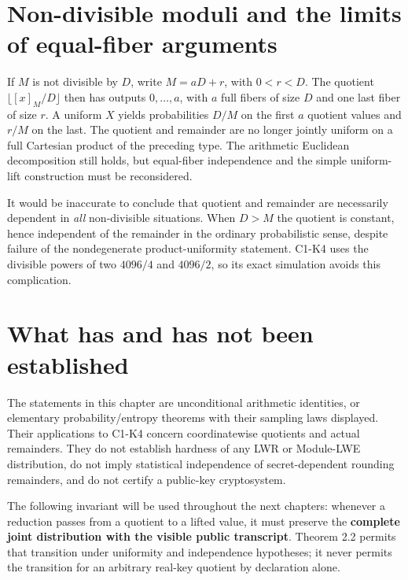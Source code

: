\documentclass[
  11pt,
  a4paper,
  oneside]{report}
\begin{document}
\section{Non-divisible moduli and the limits of equal-fiber
arguments}\label{non-divisible-moduli-and-the-limits-of-equal-fiber-arguments}

If \(M\) is not divisible by \(D\), write \(M=aD+r\), with \(0<r<D\).
The quotient \(\lfloor[x]_M/D\rfloor\) then has outputs \(0,\ldots,a\),
with \(a\) full fibers of size \(D\) and one last fiber of size \(r\). A
uniform \(X\) yields probabilities \(D/M\) on the first \(a\) quotient
values and \(r/M\) on the last. The quotient and remainder are no longer
jointly uniform on a full Cartesian product of the preceding type. The
arithmetic Euclidean decomposition still holds, but equal-fiber
independence and the simple uniform-lift construction must be
reconsidered.

It would be inaccurate to conclude that quotient and remainder are
necessarily dependent in \emph{all} non-divisible situations. When
\(D>M\) the quotient is constant, hence independent of the remainder in
the ordinary probabilistic sense, despite failure of the nondegenerate
product-uniformity statement. C1-K4 uses the divisible powers of two
\(4096/4\) and \(4096/2\), so its exact simulation avoids this
complication.

\section{What has and has not been
established}\label{what-has-and-has-not-been-established}

The statements in this chapter are unconditional arithmetic identities,
or elementary probability/entropy theorems with their sampling laws
displayed. Their applications to C1-K4 concern coordinatewise quotients
and actual remainders. They do not establish hardness of any LWR or
Module-LWE distribution, do not imply statistical independence of
secret-dependent rounding remainders, and do not certify a public-key
cryptosystem.

The following invariant will be used throughout the next chapters:
whenever a reduction passes from a quotient to a lifted value, it must
preserve the \textbf{complete joint distribution with the visible public
transcript}. Theorem 2.2 permits that transition under uniformity and
independence hypotheses; it never permits the transition for an
arbitrary real-key quotient by declaration alone.
\end{document}
